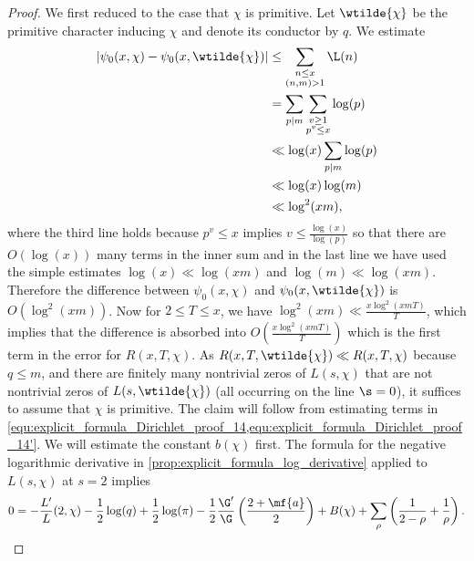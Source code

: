     \begin{proof}
      We first reduced to the case that \(\chi\) is primitive. Let \(\wtilde{\chi}\) be the primitive character inducing \(\chi\) and denote its conductor by \(q\). We estimate
      \begin{equation}\label{equ:difference_between_Dirichlet-Chebyshevs}
        \begin{aligned}
          |\psi_{0}(x,\chi)-\psi_{0}(x,\wtilde{\chi})| &\le \sum_{\substack{n \le x \\ (n,m) > 1}}\L(n) \\
          &= \sum_{p \mid m}\sum_{\substack{v \ge 1 \\ p^{v} \le x}}\log(p) \\
          &\ll \log(x)\sum_{p \mid m}\log(p) \\
          &\ll \log(x)\log(m) \\
          &\ll \log^{2}(xm),
        \end{aligned}
      \end{equation}
      where the third line holds because \(p^{v} \le x\) implies \(v \le \frac{\log(x)}{\log(p)}\) so that there are \(O(\log(x))\) many terms in the inner sum and in the last line we have used the simple estimates \(\log(x) \ll \log(xm)\) and \(\log(m) \ll \log(xm)\). Therefore the difference between \(\psi_{0}(x,\chi)\) and \(\psi_{0}(x,\wtilde{\chi})\) is \(O(\log^{2}(xm))\). Now for \(2 \le T \le x\), we have \(\log^{2}(xm) \ll \frac{x\log^{2}(xmT)}{T}\), which implies that the difference is absorbed into \(O\left(\frac{x\log^{2}(xmT)}{T}\right)\) which is the first term in the error for \(R(x,T,\chi)\). As \(R(x,T,\wtilde{\chi}) \ll R(x,T,\chi)\) because \(q \le m\), and there are finitely many nontrivial zeros of \(L(s,\chi)\) that are not nontrivial zeros of \(L(s,\wtilde{\chi})\) (all occurring on the line \(\s = 0\)), it suffices to assume that \(\chi\) is primitive. The claim will follow from estimating terms in \cref{equ:explicit_formula_Dirichlet_proof_14,equ:explicit_formula_Dirichlet_proof_14'}. We will estimate the constant \(b(\chi)\) first. The formula for the negative logarithmic derivative in \cref{prop:explicit_formula_log_derivative} applied to \(L(s,\chi)\) at \(s = 2\) implies
      \begin{equation}\label{equ:explicit_formula_Dirichlet_corollary_1}
        0 = -\frac{L'}{L}(2,\chi)-\frac{1}{2}\log(q)+\frac{1}{2}\log(\pi)-\frac{1}{2}\frac{\G'}{\G}\left(\frac{2+\mf{a}}{2}\right)+B(\chi)+\sum_{\rho}\left(\frac{1}{2-\rho}+\frac{1}{\rho}\right).

\end{equation}
\end{proof}
